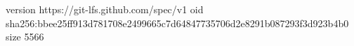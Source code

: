 version https://git-lfs.github.com/spec/v1
oid sha256:bbee25ff913d781708e2499665c7d64847735706d2e8291b087293f3d923b4b0
size 5566
